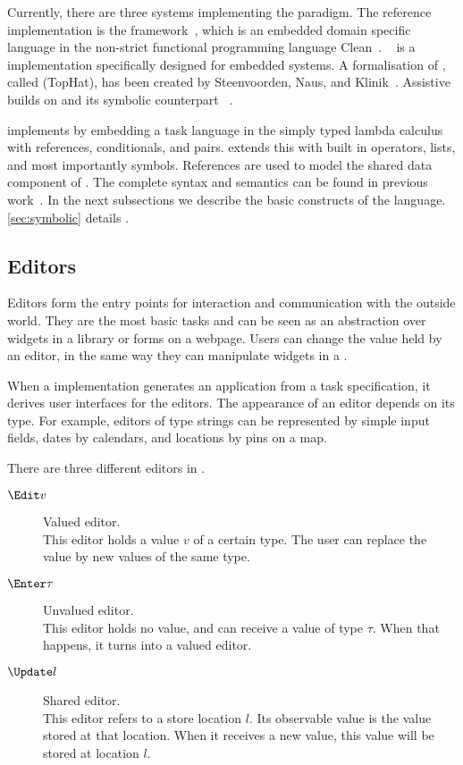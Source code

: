 Currently, there are three systems implementing the \TOP paradigm.
The reference implementation is the \ITASKS framework~\cite{DBLP:conf/ppdp/PlasmeijerLMAK12},
which is an embedded domain specific language in the non-strict functional programming language Clean~\cite{plasmeijer2002clean}.
\MTASKS~\cite{DBLP:conf/cgo/KoopmanLP18} is a \TOP implementation specifically designed for embedded systems.
A formalisation of \TOP, called \TOPHAT (TopHat), has been created by Steenvoorden, Naus, and Klinik~\cite{DBLP:conf/ppdp/SteenvoordenNK19}.
Assistive \TOPHAT builds on \TOPHAT and its symbolic counterpart \STOPHAT~\cite{Naus2019}.

\TOPHAT implements \TOP by embedding a task language in the simply typed lambda calculus with references, conditionals, and pairs.
\STOPHAT extends this with built in operators, lists, and most importantly symbols.
References are used to model the shared data component of \TOP.
The complete syntax and semantics can be found in previous work~\cite{DBLP:conf/ppdp/SteenvoordenNK19}.
In the next subsections we describe the basic constructs of the \TOPHAT language.
\cref{sec:symbolic} details \STOPHAT.


\subsection{Editors}
\label{sub:editors}

Editors form the entry points for interaction and communication with the outside world.
They are the most basic tasks and can be seen as an abstraction over widgets in a \GUI library or forms on a webpage.
Users can change the value held by an editor, in the same way they can manipulate widgets in a \GUI.

When a \TOP implementation generates an application from a task specification, it derives user interfaces for the editors.
The appearance of an editor depends on its type.
For example, editors of type strings can be represented by simple input fields, dates by calendars, and locations by pins on a map.

There are three different editors in \TOPHAT.
\begin{description}
  \item[$\Edit v$] Valued editor.\\
    This editor holds a value $v$ of a certain type.
    The user can replace the value by new values of the same type.
  \item[$\Enter \tau$] Unvalued editor.\\
    This editor holds no value, and can receive a value of type $\tau$.
    When that happens, it turns into a valued editor.
  \item[$\Update l$] Shared editor.\\
    This editor refers to a store location $l$.
    Its observable value is the value stored at that location.
    When it receives a new value, this value will be stored at location $l$.
\end{description}


